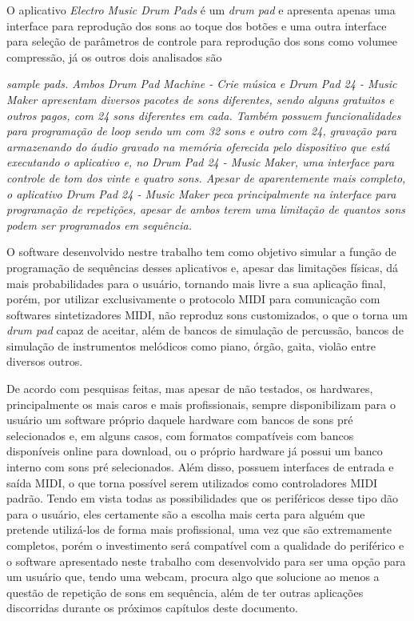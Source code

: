 \documentclass[12pt]{report}
\begin{document}
O aplicativo {\it Electro Music Drum Pads} é um {\it drum pad} e apresenta apenas uma interface para reprodução dos sons ao toque dos botões e uma outra interface para seleção de parâmetros de controle para reprodução dos sons como volumee compressão, já os outros dois analisados são {\it sample pads. Ambos {\it Drum Pad Machine} - Crie música e {\it Drum Pad 24 - Music Maker} apresentam diversos pacotes de sons diferentes, sendo alguns gratuitos e outros pagos, com 24 sons diferentes em cada. Também possuem funcionalidades para programação de {\it loop} sendo um com 32 sons e outro com 24, gravação para armazenando do áudio gravado na memória oferecida pelo dispositivo que está executando o aplicativo e, no {\it Drum Pad 24 - Music Maker}, uma interface para controle de tom dos vinte e quatro sons. Apesar de aparentemente mais completo, o aplicativo {\it Drum Pad 24 - Music Maker} peca principalmente na interface para programação de repetições, apesar de ambos terem uma limitação de quantos sons podem ser programados em sequência.

O software desenvolvido nestre trabalho tem como objetivo simular a função de programação de sequências desses aplicativos e, apesar das limitações físicas, dá mais probabilidades para o usuário, tornando mais livre a sua aplicação final, porém, por utilizar exclusivamente o protocolo MIDI para comunicação com softwares sintetizadores MIDI, não reproduz sons customizados, o que o torna um {\it drum pad} capaz de aceitar, além de bancos de simulação de percussão, bancos de simulação de instrumentos melódicos como piano, órgão, gaita, violão entre diversos outros.

De acordo com pesquisas feitas, mas apesar de não testados, os hardwares, principalmente os mais caros e mais profissionais, sempre disponibilizam para o usuário um software próprio daquele hardware com bancos de sons pré selecionados e, em alguns casos, com formatos compatíveis com bancos disponíveis online para download, ou o próprio hardware já possui um banco interno com sons pré selecionados. Além disso, possuem interfaces de entrada e saída MIDI, o que torna possível serem utilizados como controladores MIDI padrão. Tendo em vista todas as possibilidades que os periféricos desse tipo dão para o usuário, eles certamente são a escolha mais certa para alguém que pretende utilizá-los de forma mais profissional, uma vez que são extremamente completos, porém o investimento será compatível com a qualidade do periférico e o software apresentado neste trabalho com desenvolvido para ser uma opção para um usuário que, tendo uma webcam, procura algo que solucione ao menos a questão de repetição de sons em sequência, além de ter outras aplicações discorridas durante os próximos capítulos deste documento.

}
\end{document}

